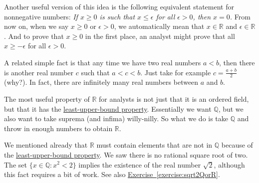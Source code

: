 \documentclass[12pt]{book}
\newcommand{\R}{{\mathbb{R}}}
\newcommand{\Q}{{\mathbb{Q}}}
\theoremstyle{plain}
\theoremstyle{remark}
\theoremstyle{definition}
\theoremstyle{exercise}
\theoremstyle{example}
\newcommand{\exerciseref}[1]{\hyperref[#1]{Exercise~\ref*{#1}}}
\begin{document}
Another useful version of this idea is the following equivalent
statement for nonnegative numbers: \emph{If $x \geq 0$ is such that $x \leq \epsilon$ for all
$\epsilon > 0$, then $x = 0$.}  From now on, when we say
$x \geq 0$ or
$\epsilon > 0$, we automatically mean that $x \in \R$ and $\epsilon \in \R$.
And to prove that $x \geq 0$ in the first place, an analyst might prove
that all $x \geq -\epsilon$ for all $\epsilon > 0$.

A related simple fact is that 
any time we have two real numbers $a < b$, then there is another
real number $c$ such that
$a < c < b$.  Just take for example $c = \frac{a+b}{2}$ (why?).  In fact,
there are infinitely many real numbers between $a$ and $b$.

The most useful property of $\R$ for analysts
is not just that it is an ordered field, but that it has the
\hyperref[defn:lub]{least-upper-bound property}.  Essentially we want $\Q$, but we also
want to take suprema (and infima) willy-nilly.  So what we do is 
take $\Q$ and
throw in enough numbers to obtain $\R$.



We mentioned already that $\R$ must contain elements that are not in $\Q$
because of the \hyperref[defn:lub]{least-upper-bound property}.
We saw there is no
rational square root of two.  The set
$\{ x \in \Q : x^2 < 2 \}$ implies the existence of the real number
$\sqrt{2}$, although this fact requires a bit of work.  See also
\exerciseref{exercise:sqrt2QorR}.
\end{document}
